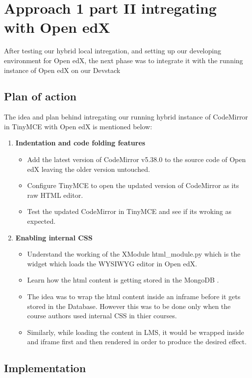 \chapter{Approach 1 part II intregating with Open edX}
After testing our hybrid local intregation, and setting up our developing environment for Open edX,
the next phase was to integrate it with the running instance of Open edX on our Devstack
\section{Plan of action}
The idea and plan behind intregating our running hybrid instance of CodeMirror in TinyMCE with
Open edX is mentioned below:
\begin{enumerate}
\item\textbf{Indentation and code folding features}
\begin{itemize}
\item Add the latest version of CodeMirror v5.38.0 to the source code of Open edX
leaving the older version untouched.
\item Configure TinyMCE to open the updated version of CodeMirror as its raw HTML
editor.
\item Test the updated CodeMirror in TinyMCE and see if its wroking as expected.
\end{itemize}
\item\textbf{Enabling internal CSS}
\begin{itemize}
\item Understand the working of the XModule html\_module.py which is the widget
which loads the WYSIWYG editor in Open edX.
\item Learn how the html content is getting stored in the MongoDB .
\item The idea was to wrap the html content inside an inframe before it gets stored in the
Database. However this was to be done only when the course authors used internal
CSS in thier courses.
\item Similarly, while loading the content in LMS, it would be wrapped inside and iframe
first and then rendered in order to produce the desired effect.
\end{itemize}
\end{enumerate}

\section{Implementation}
